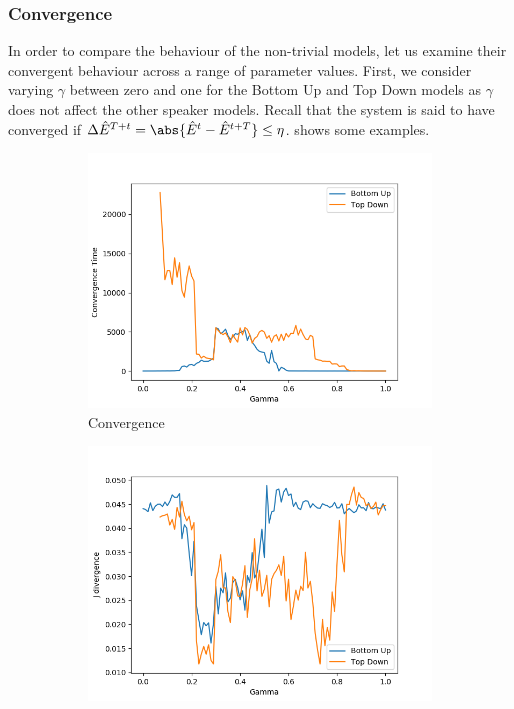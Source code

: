 \subsubsection{Convergence}

In order to compare the behaviour of the non-trivial models, let us examine their convergent behaviour across a range of parameter values. First, we consider varying $\gamma$ between zero and one for the Bottom Up and Top Down models as $\gamma$ does not affect the other speaker models. Recall that the system is said to have converged if $\Delta \hat{E}^{T+t} = \abs{ \hat{E}^t -  \hat{E}^{t+T}}  \leq \eta$.  shows some examples. 

\begin{figure}[H]
 \centering
  \begin{subfigure}[ht]{0.45\textwidth}
    \includegraphics[width=\textwidth]{Images/Figures/All/Convergence_ALL_n_3_p_100_gamma_100_runs_20.png}
    \caption{Convergence}\label{fig:convergence}
 \end{subfigure}
 \hfill
 \begin{subfigure}[ht]{0.45\textwidth}
    \includegraphics[width=\textwidth]{Images/Figures/All/J_Div_ALL_n_3_p_100_gamma_100_runs_20.png}

\end{subfigure}
\end{figure}
